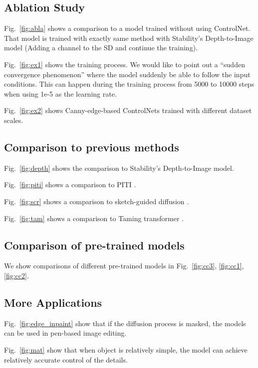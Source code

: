 \documentclass{article}
\begin{document}
\subsection{Ablation Study}

Fig.~\ref{fig:abla} shows a comparison to a model trained without using ControlNet. That model is trained with exactly same method with Stability's Depth-to-Image model (Adding a channel to the SD and continue the training). 

Fig.~\ref{fig:ex1} shows the training process. We would like to point out a ``sudden convergence phenomenon'' where the model suddenly be able to follow the input conditions. This can happen during the training process from 5000 to 10000 steps when using 1e-5 as the learning rate.

Fig.~\ref{fig:ex2} shows Canny-edge-based ControlNets trained with different dataset scales.

\subsection{Comparison to previous methods}

Fig.~\ref{fig:depth} shows the comparison to Stability's Depth-to-Image model.

Fig.~\ref{fig:piti} shows a comparison to PITI \cite{2205.12952}.

Fig.~\ref{fig:scr} shows a comparison to sketch-guided diffusion \cite{voynov2022sketch}.

Fig.~\ref{fig:tam} shows a comparison to Taming transformer \cite{DBLP:journals/corr/abs-2012-09841}.

\subsection{Comparison of pre-trained models}

We show comparisons of different pre-trained models in Fig.~\ref{fig:cc3}, \ref{fig:cc1}, \ref{fig:cc2}.

\subsection{More Applications}

Fig.~\ref{fig:edge_inpaint} show that if the diffusion process is masked, the models can be used in pen-based image editing.

Fig.~\ref{fig:mat} show that when object is relatively simple, the model can achieve relatively accurate control of the details.
\end{document}
